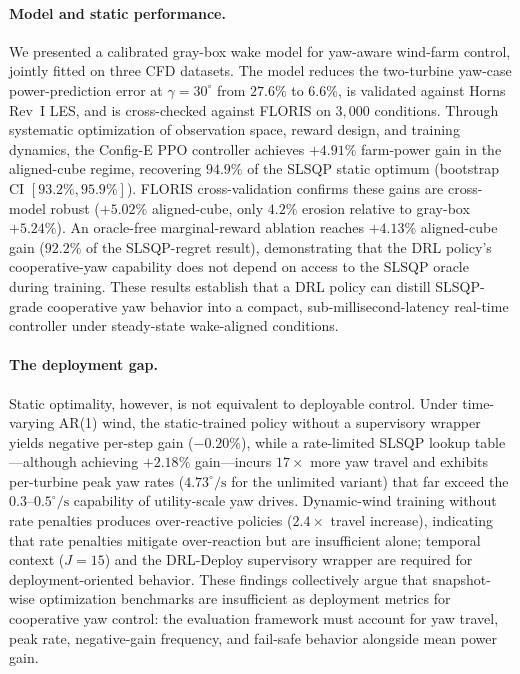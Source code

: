 \documentclass[final,5p,times]{elsarticle}
\begin{document}
\paragraph{Model and static performance.}
We presented a calibrated gray-box wake model for yaw-aware wind-farm control, jointly fitted on three CFD datasets. The model reduces the two-turbine yaw-case power-prediction error at $\gamma\!=\!30^\circ$ from $27.6\%$ to $6.6\%$, is validated against Horns Rev~I LES, and is cross-checked against FLORIS on $3{,}000$ conditions. Through systematic optimization of observation space, reward design, and training dynamics, the Config-E PPO controller achieves $+4.91\%$ farm-power gain in the aligned-cube regime, recovering $94.9\%$ of the SLSQP static optimum (bootstrap CI $[93.2\%,95.9\%]$). FLORIS cross-validation confirms these gains are cross-model robust ($+5.02\%$ aligned-cube, only $4.2\%$ erosion relative to gray-box $+5.24\%$). An oracle-free marginal-reward ablation reaches $+4.13\%$ aligned-cube gain ($92.2\%$ of the SLSQP-regret result), demonstrating that the DRL policy's cooperative-yaw capability does not depend on access to the SLSQP oracle during training. These results establish that a DRL policy can distill SLSQP-grade cooperative yaw behavior into a compact, sub-millisecond-latency real-time controller under steady-state wake-aligned conditions.

\paragraph{The deployment gap.}
Static optimality, however, is not equivalent to deployable control. Under time-varying AR(1) wind, the static-trained policy without a supervisory wrapper yields negative per-step gain ($-0.20\%$), while a rate-limited SLSQP lookup table---although achieving $+2.18\%$ gain---incurs $17{\times}$ more yaw travel and exhibits per-turbine peak yaw rates ($4.73^\circ\!/\!\mathrm{s}$ for the unlimited variant) that far exceed the $0.3$--$0.5^\circ\!/\!\mathrm{s}$ capability of utility-scale yaw drives. Dynamic-wind training without rate penalties produces over-reactive policies ($2.4{\times}$ travel increase), indicating that rate penalties mitigate over-reaction but are insufficient alone; temporal context ($J{=}15$) and the DRL-Deploy supervisory wrapper are required for deployment-oriented behavior. These findings collectively argue that snapshot-wise optimization benchmarks are insufficient as deployment metrics for cooperative yaw control: the evaluation framework must account for yaw travel, peak rate, negative-gain frequency, and fail-safe behavior alongside mean power gain.
\end{document}
